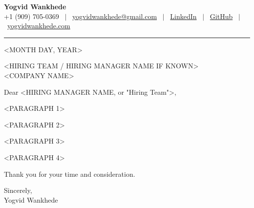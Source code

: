 \documentclass[10pt,letterpaper]{article}
\begin{document}
\fontsize{10.5}{13}\selectfont

{\LARGE\bfseries Yogvid Wankhede}\\[0.35em]
+1 (909) 705-0369 \ $|$ \ \href{mailto:yogvidwankhede@gmail.com}{yogvidwankhede@gmail.com} \ $|$ \
\href{https://www.linkedin.com/in/yogvidwankhede}{LinkedIn} \ $|$ \
\href{https://github.com/yogvidwankhede}{GitHub} \ $|$ \
\href{https://www.yogvidwankhede.com}{yogvidwankhede.com}

\vspace{0.6em}
\hrule
\vspace{1.2em}

<MONTH DAY, YEAR>

\vspace{0.8em}

<HIRING TEAM / HIRING MANAGER NAME IF KNOWN>\\
<COMPANY NAME>

\vspace{1.0em}

Dear <HIRING MANAGER NAME, or "Hiring Team">,

\vspace{0.4em}

<PARAGRAPH 1>

<PARAGRAPH 2>

<PARAGRAPH 3>

<PARAGRAPH 4>

\vspace{0.6em}

Thank you for your time and consideration.

\vspace{1.4em}

Sincerely,\\[0.4em]
Yogvid Wankhede
\end{document}
